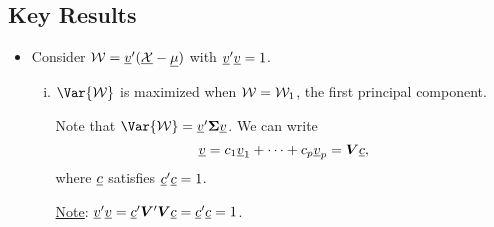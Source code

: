 \subsection*{Key Results}
\begin{itemize}
      \item Consider $ \mathcal{W}=\underline{v}'(\underline{\mathcal{X}}-\underline{\mu}) $ with $ \underline{v}'\underline{v}=1 $.
            \begin{enumerate}[i.]
                  \item $ \Var{\RV{W}} $ is maximized when $ \mathcal{W}=\mathcal{W}_1 $, the first principal component.
                        \begin{framed}
                              Note that $ \Var{\RV{W}}=\Vector{v}'\Matrix{\Sigma}\Vector{v} $.
                              We can write
                              \[ \underline{v}=c_1 \underline{v}_1+\cdots+c_p \underline{v}_p=\bm{V}\underline{c}, \]
                              where $ \underline{c} $ satisfies $ \underline{c}'\underline{c}=1 $.

                              \underline{Note}: $ \underline{v}'\underline{v}=\underline{c}'\bm{V}'\bm{V}\underline{c}=\underline{c}'\underline{c}=1 $.


\end{framed}
\end{enumerate}
\end{itemize}
